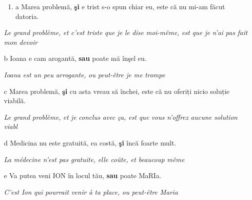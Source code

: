 \begin{enumerate}
\item \label{bkm:Ref301679065}a  Marea problemă, \textbf{şi} e trist s-o spun chiar eu, este că nu mi-am făcut datoria.


\end{enumerate}
{\itshape
Le grand problème, et c'est triste que je le dise moi-même, est que je n'ai pas fait mon devoir}

  b  Ioana e cam arogantă, \textbf{sau} poate mă înşel eu.

{\itshape
Ioana est un peu arrogante, ou peut-être je me trompe}

  c  Marea problemă, \textbf{şi} cu asta vreau să închei, este că nu oferiți nicio soluție viabilă.

{\itshape
Le grand problème, et je conclus avec ça, est que vous n'offrez aucune solution viabl}

  d  Medicina nu este gratuită, ea costă, \textbf{şi} încă foarte mult.

{\itshape
La médecine n'est pas gratuite, elle coûte, et beaucoup même}

  e  Va putea veni ION în locul tău, \textbf{sau} poate MaRIa.

{\itshape
C'est Ion qui pourrait venir à ta place, ou peut-être Maria}


